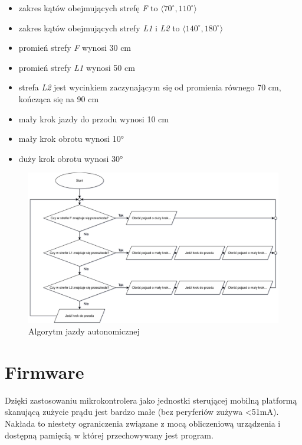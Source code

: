 \begin{itemize}
    \item zakres kątów obejmujących strefę \emph{F} to $\langle70^{\circ}, 110^{\circ}\rangle$
    \item zakres kątów obejmujących strefy \emph{L1} i \emph{L2} to $\langle140^{\circ}, 180^{\circ}\rangle$
    \item promień strefy \emph{F} wynosi 30 cm
    \item promień strefy \emph{L1} wynosi 50 cm
    \item strefa \emph{L2} jest wycinkiem zaczynającym się od promienia równego 70 cm, kończąca się na 90 cm
    \item mały krok jazdy do przodu wynosi 10 cm
    \item mały krok obrotu wynosi 10°
    \item duży krok obrotu wynosi 30°
\end{itemize}

\begin{figure}[ht]
	\centering
		\includegraphics[width=1\linewidth]{rys/autodrive-algorithm.pdf}
	\caption{Algorytm jazdy autonomicznej}
	\label{fig:autodrive-algorithm}
\end{figure}

\section{Firmware}
\label{sec:firmware}
Dzięki zastosowaniu mikrokontrolera jako jednostki sterującej mobilną platformą skanującą zużycie prądu jest bardzo małe (bez peryferiów zużywa <51mA\cite{stm32-datasheet}). Nakłada to niestety ograniczenia związane z mocą obliczeniową urządzenia i dostępną pamięcią w której przechowywany jest program. 

